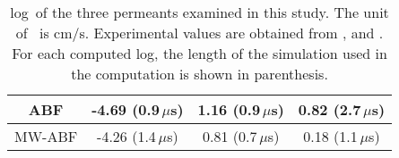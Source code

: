 \begin{table}[h]
{\begin{tabular}{|c|c|c|c|}
ABF               & -4.69 (0.9\,$\mu$s) & 1.16 (0.9\,$\mu$s)      &  0.82 (2.7\,$\mu$s)   \\ \hline
MW-ABF    &  -4.26 (1.4\,$\mu$s)   & 0.81 (0.7\,$\mu$s)       & 0.18 (1.1\,$\mu$s) \\ \hline
\end{tabular}
}
\caption{ log\perm~of the three permeants examined in this study. The unit of \perm~is cm/s. Experimental values are obtained from ,  and . 
For each computed log\perm, the length of the simulation used in the computation is shown in parenthesis.}
\label{table:results}
\end{table}


